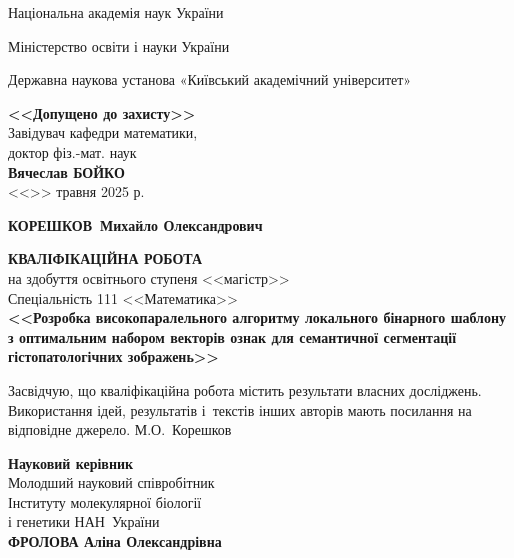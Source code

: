 \documentclass{thesis}
\newcommand{\MyFullName}{КОРЕШКОВ~Михайло Олександрович}
\newcommand{\MyReverseInitialName}{М.О.~Корешков}
\newcommand{\ThesisName}{Розробка високопаралельного алгоритму локального бінарного шаблону з оптимальним набором векторів ознак для семантичної сегментації гістопатологічних зображень}
\newcommand{\SuperviserFullName}{ФРОЛОВА Аліна Олександрівна}
\newcommand{\SuperviserAffiliation}{Молодший науковий співробітник\\Інституту молекулярної біології\\і генетики НАН~України}
\newcommand{\1}{\mathbb 1}
\begin{document}
\allowdisplaybreaks

\large

\setcounter{page}{1}
\thispagestyle{empty}
\centerline{Національна академія наук України}
\centerline{Міністерство освіти і науки України}
\centerline{Державна наукова установа «Київський академічний університет»}

\vspace{10mm}

\begin{flushright}
\begin{minipage}{100mm}
\begin{center}\large {\bf <<Допущено до захисту>>}\\
Завідувач кафедри математики,\\
доктор фіз.-мат. наук\\
{\bf Вячеслав БОЙКО}\\
<<\underline{\hspace{8mm}}>> травня 2025 р.
\end{center}
\end{minipage}
\end{flushright}

\vspace{10mm}

\centerline{\Large \bf \MyFullName}

\begin{center}
{\bf КВАЛІФІКАЦІЙНА РОБОТА}\\
на здобуття освітнього ступеня <<магістр>>\\
Спеціальність 111 <<Математика>>\\[4mm]
{\Large \bf <<\ThesisName>>}
\end{center}


\vspace{5mm}

\noindent
{Засвідчую, що кваліфікаційна робота містить результати власних досліджень. Використання ідей, результатів і~текстів інших авторів мають посилання на відповідне джерело.
\underline{\hspace{18mm}} \MyReverseInitialName \par}

\vspace{5mm}

\begin{flushright}
\begin{minipage}{90mm}
\large {\bf Науковий керівник}\\
\SuperviserAffiliation\\
{\bf \SuperviserFullName }\\
\underline{\hspace{48mm}}

\end{minipage}
\end{flushright}
\end{document}
